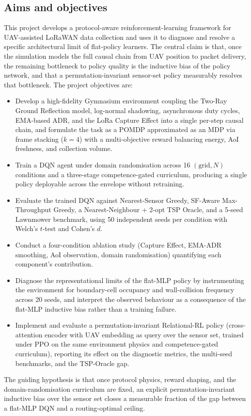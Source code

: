 \subsection{Aims and objectives}
\label{sec:aims}

This project develops a protocol-aware reinforcement-learning framework
for UAV-assisted LoRaWAN data collection and uses it to diagnose
and resolve a specific architectural limit of flat-policy learners.
The central claim is that, once the simulation models the full
causal chain from UAV position to packet delivery, the remaining
bottleneck to policy quality is the inductive bias of the policy
network, and that a permutation-invariant sensor-set policy
measurably resolves that bottleneck. The project objectives are:

\begin{itemize}
    \item Develop a high-fidelity Gymnasium environment coupling the
    Two-Ray Ground Reflection model, log-normal shadowing,
    asynchronous duty cycles, EMA-based ADR, and the LoRa Capture
    Effect into a single per-step causal chain, and formulate the
    task as a POMDP approximated as an MDP via frame stacking
    ($k{=}4$) with a multi-objective reward balancing energy, AoI
    freshness, and collection volume.
    \item Train a DQN agent under domain randomisation across 16
    $(\text{grid}, N)$ conditions and a three-stage competence-gated
    curriculum, producing a single policy deployable across the
    envelope without retraining.
    \item Evaluate the trained DQN against Nearest-Sensor Greedy,
    SF-Aware Max-Throughput Greedy, a Nearest-Neighbour + 2-opt TSP
    Oracle, and a 5-seed Lawnmower benchmark, using 50 independent
    seeds per condition with Welch's $t$-test and Cohen's $d$.
    \item Conduct a four-condition ablation study (Capture Effect,
    EMA-ADR smoothing, AoI observation, domain randomisation)
    quantifying each component's contribution.
    \item Diagnose the representational limits of the flat-MLP policy
    by instrumenting the environment for boundary-cell occupancy and
    wall-collision frequency across 20 seeds, and interpret the
    observed behaviour as a consequence of the flat-MLP inductive
    bias rather than a training failure.
    \item Implement and evaluate a permutation-invariant Relational-RL
    policy (cross-attention encoder with UAV embedding as query over
    the sensor set, trained under PPO on the same environment physics
    and competence-gated curriculum), reporting its effect on the
    diagnostic metrics, the multi-seed benchmarks, and the
    TSP-Oracle gap.
\end{itemize}

The guiding hypothesis is that once protocol physics, reward shaping,
and the domain-randomisation curriculum are fixed, an explicit
permutation-invariant inductive bias over the sensor set closes a
measurable fraction of the gap between a flat-MLP DQN and a
routing-optimal ceiling.

